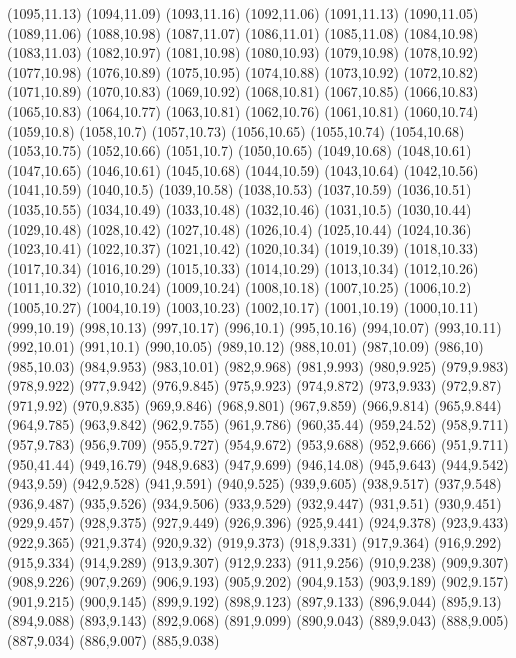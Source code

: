 (1095,11.13)
(1094,11.09)
(1093,11.16)
(1092,11.06)
(1091,11.13)
(1090,11.05)
(1089,11.06)
(1088,10.98)
(1087,11.07)
(1086,11.01)
(1085,11.08)
(1084,10.98)
(1083,11.03)
(1082,10.97)
(1081,10.98)
(1080,10.93)
(1079,10.98)
(1078,10.92)
(1077,10.98)
(1076,10.89)
(1075,10.95)
(1074,10.88)
(1073,10.92)
(1072,10.82)
(1071,10.89)
(1070,10.83)
(1069,10.92)
(1068,10.81)
(1067,10.85)
(1066,10.83)
(1065,10.83)
(1064,10.77)
(1063,10.81)
(1062,10.76)
(1061,10.81)
(1060,10.74)
(1059,10.8)
(1058,10.7)
(1057,10.73)
(1056,10.65)
(1055,10.74)
(1054,10.68)
(1053,10.75)
(1052,10.66)
(1051,10.7)
(1050,10.65)
(1049,10.68)
(1048,10.61)
(1047,10.65)
(1046,10.61)
(1045,10.68)
(1044,10.59)
(1043,10.64)
(1042,10.56)
(1041,10.59)
(1040,10.5)
(1039,10.58)
(1038,10.53)
(1037,10.59)
(1036,10.51)
(1035,10.55)
(1034,10.49)
(1033,10.48)
(1032,10.46)
(1031,10.5)
(1030,10.44)
(1029,10.48)
(1028,10.42)
(1027,10.48)
(1026,10.4)
(1025,10.44)
(1024,10.36)
(1023,10.41)
(1022,10.37)
(1021,10.42)
(1020,10.34)
(1019,10.39)
(1018,10.33)
(1017,10.34)
(1016,10.29)
(1015,10.33)
(1014,10.29)
(1013,10.34)
(1012,10.26)
(1011,10.32)
(1010,10.24)
(1009,10.24)
(1008,10.18)
(1007,10.25)
(1006,10.2)
(1005,10.27)
(1004,10.19)
(1003,10.23)
(1002,10.17)
(1001,10.19)
(1000,10.11)
(999,10.19)
(998,10.13)
(997,10.17)
(996,10.1)
(995,10.16)
(994,10.07)
(993,10.11)
(992,10.01)
(991,10.1)
(990,10.05)
(989,10.12)
(988,10.01)
(987,10.09)
(986,10)
(985,10.03)
(984,9.953)
(983,10.01)
(982,9.968)
(981,9.993)
(980,9.925)
(979,9.983)
(978,9.922)
(977,9.942)
(976,9.845)
(975,9.923)
(974,9.872)
(973,9.933)
(972,9.87)
(971,9.92)
(970,9.835)
(969,9.846)
(968,9.801)
(967,9.859)
(966,9.814)
(965,9.844)
(964,9.785)
(963,9.842)
(962,9.755)
(961,9.786)
(960,35.44)
(959,24.52)
(958,9.711)
(957,9.783)
(956,9.709)
(955,9.727)
(954,9.672)
(953,9.688)
(952,9.666)
(951,9.711)
(950,41.44)
(949,16.79)
(948,9.683)
(947,9.699)
(946,14.08)
(945,9.643)
(944,9.542)
(943,9.59)
(942,9.528)
(941,9.591)
(940,9.525)
(939,9.605)
(938,9.517)
(937,9.548)
(936,9.487)
(935,9.526)
(934,9.506)
(933,9.529)
(932,9.447)
(931,9.51)
(930,9.451)
(929,9.457)
(928,9.375)
(927,9.449)
(926,9.396)
(925,9.441)
(924,9.378)
(923,9.433)
(922,9.365)
(921,9.374)
(920,9.32)
(919,9.373)
(918,9.331)
(917,9.364)
(916,9.292)
(915,9.334)
(914,9.289)
(913,9.307)
(912,9.233)
(911,9.256)
(910,9.238)
(909,9.307)
(908,9.226)
(907,9.269)
(906,9.193)
(905,9.202)
(904,9.153)
(903,9.189)
(902,9.157)
(901,9.215)
(900,9.145)
(899,9.192)
(898,9.123)
(897,9.133)
(896,9.044)
(895,9.13)
(894,9.088)
(893,9.143)
(892,9.068)
(891,9.099)
(890,9.043)
(889,9.043)
(888,9.005)
(887,9.034)
(886,9.007)
(885,9.038)
